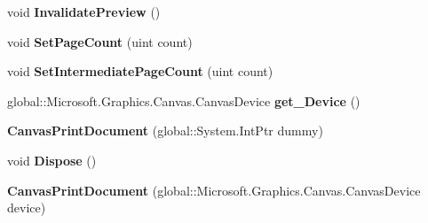 \begin{DoxyCompactItemize}
\item 
\mbox{\label{class_microsoft_1_1_graphics_1_1_canvas_1_1_printing_1_1_canvas_print_document_a8bbb671d9de2e348757da7e7d7c1935c}} 
void {\bfseries Invalidate\+Preview} ()
\item 
\mbox{\label{class_microsoft_1_1_graphics_1_1_canvas_1_1_printing_1_1_canvas_print_document_af703c668de7e2905cf76a064da8dbd29}} 
void {\bfseries Set\+Page\+Count} (uint count)
\item 
\mbox{\label{class_microsoft_1_1_graphics_1_1_canvas_1_1_printing_1_1_canvas_print_document_a570bac56fc10f4180d8e4371d1c2b1ec}} 
void {\bfseries Set\+Intermediate\+Page\+Count} (uint count)
\item 
\mbox{\label{class_microsoft_1_1_graphics_1_1_canvas_1_1_printing_1_1_canvas_print_document_ac10aedd8e487c76596dbcc4eb0804aa4}} 
global\+::\+Microsoft.\+Graphics.\+Canvas.\+Canvas\+Device {\bfseries get\+\_\+\+Device} ()
\item 
\mbox{\label{class_microsoft_1_1_graphics_1_1_canvas_1_1_printing_1_1_canvas_print_document_a7b04c2627b88d8910b67203e8ee65b63}} 
{\bfseries Canvas\+Print\+Document} (global\+::\+System.\+Int\+Ptr dummy)
\item 
\mbox{\label{class_microsoft_1_1_graphics_1_1_canvas_1_1_printing_1_1_canvas_print_document_af8d1422f1d9da5b6eb9b656d9bb4144a}} 
void {\bfseries Dispose} ()
\item 
\mbox{\label{class_microsoft_1_1_graphics_1_1_canvas_1_1_printing_1_1_canvas_print_document_a4e0992b6bdb01a46f6b04c52e8c394cb}} 
{\bfseries Canvas\+Print\+Document} (global\+::\+Microsoft.\+Graphics.\+Canvas.\+Canvas\+Device device)
\item 

\end{DoxyCompactItemize}
